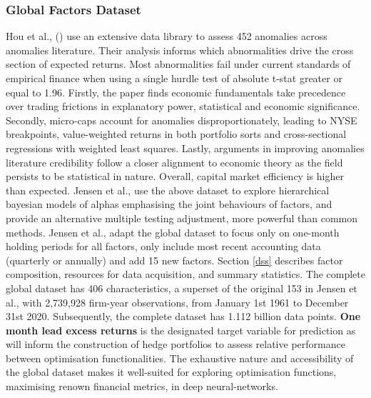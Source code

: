 \documentclass[12pt]{article}
\begin{document}
\subsubsection{Global Factors Dataset}
Hou et al., (\citeyear{hou2020replicating}) use an extensive data library to assess 452 anomalies across anomalies literature.
Their analysis informs which abnormalities drive the cross section of expected returns. 
Most abnormalities fail under current standards of empirical finance when using a single hurdle test of absolute t-stat greater or equal to 1.96.
Firstly, the paper finds economic fundamentals take precedence over trading frictions in explanatory power, statistical and economic significance.
Secondly, micro-caps account for anomalies disproportionately, leading to NYSE breakpoints, value-weighted returns in both portfolio sorts and cross-sectional regressions with weighted least squares. 
Lastly, arguments in improving anomalies literature credibility follow a closer alignment to economic theory as the field persists to be statistical in nature.
Overall, capital market efficiency is higher than expected.
Jensen et al., \citeyear{jensen2021there} use the above dataset to explore hierarchical bayesian models of alphas emphasising the joint behaviours of factors, 
and provide an alternative multiple testing adjustment, more powerful than common methods.
Jensen et al., adapt the global dataset to focus only on one-month holding periods for all factors, only include most recent accounting data (quarterly or annually) and add 15 new factors.
Section \ref{dss} describes factor composition, resources for data acquisition, and summary statistics.
The complete global dataset has 406 characteristics, a superset of the original 153 in Jensen et al., with 2,739,928 firm-year observations, from January 1st 1961 to December 31st 2020.
Subsequently, the complete dataset has 1.112 billion data points. \textbf{One month lead excess returns} is the designated target variable for prediction as will inform the construction of hedge portfolios to
assess relative performance between optimisation functionalities.
The exhaustive nature and accessibility of the global dataset makes it well-suited for exploring optimisation functions, maximising renown financial metrics, in deep neural-networks.
\end{document}

